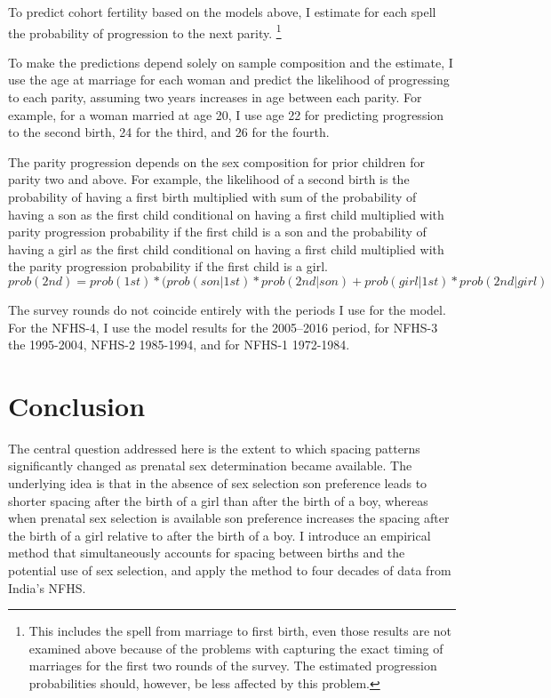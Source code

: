 \documentclass[12pt,letterpaper]{article}
\begin{document}
To predict cohort fertility based on the models above, I estimate for each spell the 
probability of progression to the next parity.%
\footnote{
This includes the spell from marriage to first birth, even those results are not 
examined above because of the problems with capturing the exact timing of marriages
for the first two rounds of the survey.
The estimated progression probabilities should, however, be less affected by this
problem.
}

To make the predictions depend solely on sample composition and the estimate, I
use the age at marriage for each woman and predict the likelihood of progressing to
each parity, assuming two years increases in age between each parity.
For example, for a woman married at age 20, I use age 22 for predicting progression 
to the second birth, 24 for the third, and 26 for the fourth.

The parity progression depends on the sex composition for prior children for
parity two and above.
For example, the likelihood of a second birth is the 
probability of having a first birth multiplied with
sum of the 
probability of having a son as the first child conditional on having a first child 
multiplied with parity progression probability if the first child is a son 
and the 
probability of having a girl as the first child  conditional on having a first child
multiplied with the parity progression probability if the first child is a girl.
$$
prob(2nd) = prob(1st) * (prob(son|1st)*prob(2nd|son) + prob(girl|1st) * prob(2nd|girl)
$$

The survey rounds do not coincide entirely with the periods I use for the model.
For the NFHS-4, I use the model results for the 2005--2016 period, 
for NFHS-3 the 1995-2004, NFHS-2 1985-1994, and for NFHS-1 1972-1984.















\section{Conclusion\label{sec:conclusion}}


The central question addressed here is the extent to which spacing patterns significantly 
changed as prenatal sex determination became available.
The underlying idea is that in the absence of sex selection son preference leads to shorter 
spacing after the birth of a girl than after the birth of a boy, whereas when prenatal sex 
selection is available son preference increases the spacing after the birth of a girl 
relative to after the birth of a boy.
I introduce an empirical method that simultaneously accounts for spacing between births 
and the potential use of sex selection, and apply the method to four decades of data 
from India's NFHS.
\end{document}
